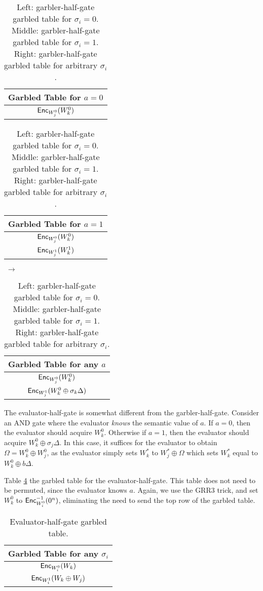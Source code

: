 \begin{table}[]
    \label{tbl:halfgate-gg-garb}
    \centering
    \begin{tabular}{|c|}
        \hline
        Garbled Table for $a = 0$ \\
        \hline
        $\textsf{Enc}_{W_j^0}(W_k^0)$ \\
        \hline
    \end{tabular}
    \begin{tabular}{|c|}
        \hline
        Garbled Table for $a = 1$ \\
        \hline
        $\textsf{Enc}_{W_j^0}(W_k^0)$ \\
        $\textsf{Enc}_{W_j^1}(W_k^1)$ \\
        \hline
    \end{tabular} $\;\rightarrow$
    \begin{tabular}{|c|}
        \hline
        Garbled Table for any $a$ \\
        \hline
        $\textsf{Enc}_{W_j^0}(W_k^0)$ \\
        $\textsf{Enc}_{W_j^1}(W_k^0 \oplus \sigma_k\Delta)$ \\
        \hline
    \end{tabular}
    \caption{Left: garbler-half-gate garbled table for $\sigma_i = 0$. Middle: garbler-half-gate garbled table for $\sigma_i = 1$. Right: garbler-half-gate garbled table for arbitrary $\sigma_i$.}
\end{table}

The evaluator-half-gate is somewhat different from the garbler-half-gate.
Consider an AND gate where the evaluator \textit{knows} the semantic value of $a$.
If $a = 0$, then the evaluator should acquire $W_k^0$. 
Otherwise if $a = 1$, then the evaluator should acquire $W_k^0 \oplus \sigma_j\Delta$.
In this case, it suffices for the evaluator to obtain $\Omega = W_k^0 \oplus W_j^0$, as the evaluator simply sets $W_k^*$ to $W_j^* \oplus \Omega$ which sets $W_k^*$ equal to $W_k^0 \oplus b\Delta$.

Table \ref{tbl:halfgate-gg-eval} the garbled table for the evaluator-half-gate.
This table does not need to be permuted, since the evaluator knows $a$.
Again, we use the GRR3 trick, and set $W_k^0$ to $\textsf{Enc}^{-1}_{W_i^0}(0^n)$, eliminating the need to send the top row of the garbled table.

\begin{table}[h]
    \label{tbl:halfgate-gg-eval}
    \centering
    \begin{tabular}{|c|}
        \hline
        Garbled Table for any $\sigma_i$ \\
        \hline
        $\textsf{Enc}_{W_i^0}(W_k)$ \\
        $\textsf{Enc}_{W_i^1}(W_k \oplus W_j)$ \\
        \hline
    \end{tabular}
    \caption{Evaluator-half-gate garbled table.}
\end{table}

